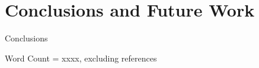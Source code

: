 \documentclass[9pt,technote]{IEEEtran}
\begin{document}
\section{Conclusions and Future Work}

Conclusions

Word Count = xxxx, excluding references



\end{document}

